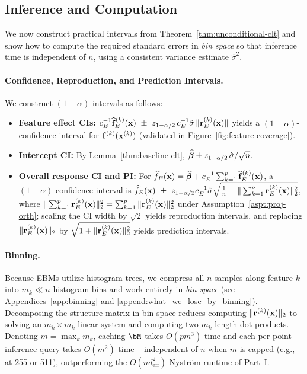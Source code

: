 	\subsection{Inference and Computation}
    We now construct practical intervals from Theorem~\ref{thm:unconditional-clt} and show how to compute the required standard errors in \emph{bin space} so that inference time is independent of $n$, using a consistent variance estimate $\hat{\sigma}^2$.
    
    \paragraph{Confidence, Reproduction, and Prediction Intervals.}
    We construct $(1-\alpha)$ intervals as follows:
    \vspace{-2ex}
    \begin{itemize}
        \item \textbf{Feature effect CIs:} $c_E^{-1}\widehat{\f}^{(k)}_E(\bx)\ \pm\ z_{1-\alpha/2}\,c_E^{-1}\hat{\sigma}\,\lVert\rveck_E(\bx)\rVert$ yields a $(1-\alpha)$-confidence interval for $\mathbf{f}^{(k)}(\mathbf{x}^{(k)})$ (validated in Figure~\ref{fig:feature-coverage}).
        \item \textbf{Intercept CI:} By Lemma~\ref{thm:baseline-clt}, $\widehat{\bm{\beta}}\pm z_{1-\alpha/2}\,\hat{\sigma}/\sqrt{n}$.
        \item \textbf{Overall response CI and PI:} For $\widehat{f}_E(\mathbf{x})=\widehat{\bm{\beta}}+c_E^{-1}\sum_{k=1}^p \widehat{\mathbf{f}}^{(k)}_E(\mathbf{x})$, a $(1-\alpha)$ confidence interval is $\widehat{f}_E(\bx)\ \pm\ z_{1-\alpha/2}c_E^{-1}\hat{\sigma}\sqrt{\frac{1}{n}+\|\sum_{k=1}^p \rveck_E(\bx)\|_2^2}$, where $\|\sum_{k=1}^p \mathbf{r}^{(k)}_E(\mathbf{x})\|_2^2 = \sum_{k=1}^p \|\mathbf{r}^{(k)}_E(\mathbf{x})\|_2^2$ under Assumption~\ref{aspt:proj-orth}; scaling the CI width by $\sqrt{2}$ yields reproduction intervals, and replacing $\|\mathbf{r}^{(k)}_E(\mathbf{x})\|_2$ by $\sqrt{1+\|\mathbf{r}^{(k)}_E(\mathbf{x})\|_2^2}$ yields prediction intervals.
    \end{itemize}
    \vspace{-1ex}

    \paragraph{Binning.} Because EBMs \citep{nori2019interpretmlunifiedframeworkmachine} utilize histogram trees, we compress all $n$ samples along feature $k$ into $m_k\!\ll\!n$ histogram bins and work entirely in \emph{bin space} (see Appendices~\ref{app:binning} and \ref{append:what_we_lose_by_binning}). Decomposing the structure matrix in bin space reduces computing $\|\mathbf{r}^{(k)}(\mathbf{x})\|_2$ to solving an $m_k\times m_k$ linear system and computing two $m_k$-length dot products. Denoting $m = \max_k m_k$, caching $\bM$ takes $O(pm^3)$ time and each per-point inference query takes $O(m^2)$ time -- independent of $n$ when $m$ is capped (e.g., at 255 or 511), outperforming the $O(nd_{\text{eff}}^2)$ Nystr\"om runtime of Part~I.
    
